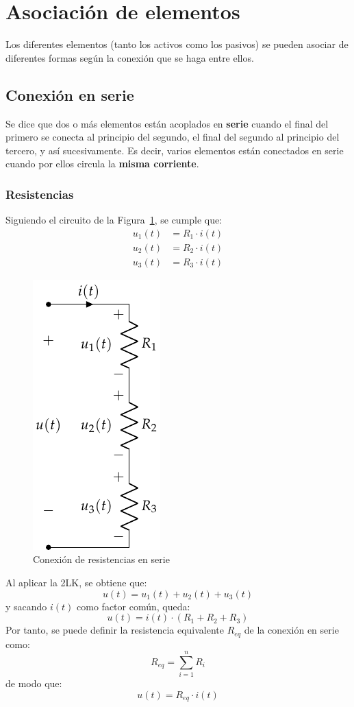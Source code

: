 	
	\section{Asociación de elementos}
	
	Los diferentes elementos (tanto los activos como los pasivos) se pueden asociar de diferentes formas según la conexión que se haga entre ellos. 
	
	\subsection{Conexión en serie}
	Se dice que dos o más elementos están acoplados en \textbf{serie} cuando el final del primero se conecta al principio del segundo, el final del segundo al principio del tercero, y así sucesivamente. Es decir, varios elementos están conectados en serie cuando por ellos circula la \textbf{misma corriente}. 
	
	\subsubsection{Resistencias}
	Siguiendo el circuito de la Figura~\ref{fig.serie}, se cumple que:
		\begin{align*}
			u_1(t) &= R_1 \cdot i(t)\\
			u_2(t) &= R_2 \cdot i(t)\\
			u_3(t) &= R_3 \cdot i(t)
		\end{align*}
		\begin{figure}[H]
			\centering
			\includegraphics[width=0.2\linewidth]{../figs/AsociacionSerie.pdf}
			\caption{Conexión de resistencias en serie}
			\label{fig.serie}
		\end{figure}
		Al aplicar la 2LK, se obtiene que: 
		\begin{equation*}
			u(t) = u_1(t) + u_2(t) + u_3(t)
		\end{equation*}
		y sacando $i(t)$ como factor común, queda:
		\begin{equation*}
			u(t) = i(t) \cdot (R_1 + R_2 + R_3)
		\end{equation*}
		Por tanto, se puede definir la resistencia equivalente $R_{eq}$ de la conexión en serie como:
		\begin{equation}
			\boxed{R_{eq} = \sum_{i = 1}^n R_i}
		\end{equation}
		de modo que:
		\begin{equation*}
			u(t) = R_{eq} \cdot i(t)
		\end{equation*}
		
